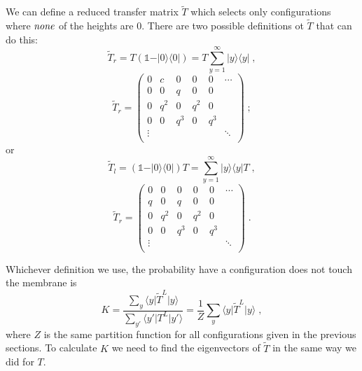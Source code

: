 \documentclass[a4paper,10pt]{article}
\newcommand{\bra}[1]{\langle #1 \vert}
\newcommand{\ket}[1]{\vert #1 \rangle}
\begin{document}
We can define a reduced transfer matrix $\tilde{T}$ which selects only configurations where $\emph{none}$ of the heights are $0$. There are two possible definitions ot $\tilde{T}$ that can do this:
\begin{equation}
  \tilde{T}_r = T(\mathbb{1}-\ket{0}\bra{0}) = T\sum_{y=1}^\infty \ket{y}\bra{y} \;,
\end{equation}
\begin{equation}
  \tilde{T}_r = \begin{pmatrix}
            0 & c   & 0   & 0   & 0   & \cdots \\
            0 & 0   & q   & 0   & 0   &        \\
            0 & q^2 & 0   & q^2 & 0   &        \\
            0 & 0   & q^3 & 0   & q^3 &        \\
       \vdots &     &     &     &     & \ddots \\
      \end{pmatrix} \;;
\end{equation}
or
\begin{equation}
  \tilde{T}_l = (\mathbb{1}-\ket{0}\bra{0})T = \sum_{y=1}^\infty \ket{y}\bra{y}T \;,
\end{equation}
\begin{equation}
  \tilde{T}_r = \begin{pmatrix}
            0 & 0   & 0   & 0   & 0   & \cdots \\
            q & 0   & q   & 0   & 0   &        \\
            0 & q^2 & 0   & q^2 & 0   &        \\
            0 & 0   & q^3 & 0   & q^3 &        \\
       \vdots &     &     &     &     & \ddots \\
      \end{pmatrix} \;.
\end{equation}

Whichever definition we use, the probability have a configuration does not touch the membrane is
\begin{equation}
  K = \frac{ \sum_y \bra{y} \tilde{T}^L \ket{y} }{\sum_{y'} \bra{y'} T^L \ket{y'}}  = \frac{1}{Z} \sum_y \bra{y} \tilde{T}^L \ket{y} \;,
\end{equation}
where $Z$ is the same partition function for all configurations given in the previous sections. To calculate $K$ we need to find the eigenvectors of $\tilde{T}$ in the same way we did for $T$. 
\end{document}
